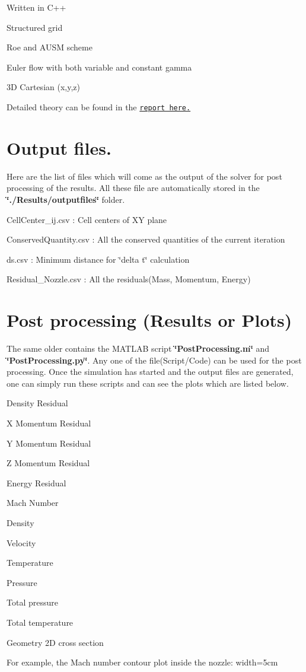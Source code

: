 \begin{DoxyItemize}
\item Written in C++
\item Structured grid
\item Roe and A\+U\+SM scheme
\item Euler flow with both variable and constant gamma
\item 3D Cartesian (x,y,z)
\item Detailed theory can be found in the \href{https://drive.google.com/open?id=0B9x_nh0D_HhzMnBjc0w5MmJpcnc}{\tt report here.}
\end{DoxyItemize}\hypertarget{index_output}{}\section{Output files.}\label{index_output}
Here are the list of files which will come as the output of the solver for post processing of the results. All these file are automatically stored in the {\bfseries \char`\"{}./\+Results/outputfiles\char`\"{}} folder.
\begin{DoxyItemize}
\item Cell\+Center\+\_\+ij.\+csv \+: Cell centers of XY plane
\item Conserved\+Quantity.\+csv \+: All the conserved quantities of the current iteration
\item ds.\+csv \+: Minimum distance for \char`\"{}delta t\char`\"{} calculation
\item Residual\+\_\+\+Nozzle.\+csv \+: All the residuals(\+Mass, Momentum, Energy)
\end{DoxyItemize}\hypertarget{index_plot}{}\section{Post processing (\+Results or Plots)}\label{index_plot}
The same older contains the M\+A\+T\+L\+AB script {\bfseries \char`\"{}\+Post\+Processing.\+m\char`\"{}} and {\bfseries \char`\"{}\+Post\+Processing.\+py\char`\"{}}. Any one of the file(Script/\+Code) can be used for the post processing. Once the simulation has started and the output files are generated, one can simply run these scripts and can see the plots which are listed below.
\begin{DoxyItemize}
\item Density Residual
\item X Momentum Residual
\item Y Momentum Residual
\item Z Momentum Residual
\item Energy Residual
\item Mach Number
\item Density
\item Velocity
\item Temperature
\item Pressure
\item Total pressure
\item Total temperature
\item Geometry 2D cross section
\end{DoxyItemize}

For example, the Mach number contour plot inside the nozzle\+: width=5cm 